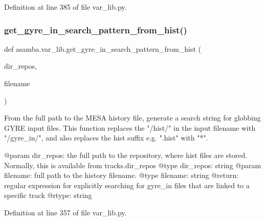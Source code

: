 Definition at line 385 of file var\+\_\+lib.\+py.

\mbox{\label{namespaceasamba_1_1var__lib_a6872a059696addcf6898489c86fb9458}} 
\subsubsection{\texorpdfstring{get\+\_\+gyre\+\_\+in\+\_\+search\+\_\+pattern\+\_\+from\+\_\+hist()}{get\_gyre\_in\_search\_pattern\_from\_hist()}}
{\footnotesize\ttfamily def asamba.\+var\+\_\+lib.\+get\+\_\+gyre\+\_\+in\+\_\+search\+\_\+pattern\+\_\+from\+\_\+hist (\begin{DoxyParamCaption}\item[{}]{dir\+\_\+repos,  }\item[{}]{filename }\end{DoxyParamCaption})}

\begin{DoxyVerb}From the full path to the MESA history file, generate a search string for globbing GYRE input files.
This function replaces the "/hist/" in the input filename with "/gyre_in/", and also replaces the 
hist suffix e.g. ".hist" with "*".

@param dir_repos: the full path to the repository, where hist files are stored. Normally, this is 
       available from tracks.dir_repos
@type dir_repos: string
@param filename: full path to the history filename. 
@type filename: string
@return: regular expression for explicitly searching for gyre_in files that are linked to a specific
      track
@rtype: string
\end{DoxyVerb}
 

Definition at line 357 of file var\+\_\+lib.\+py.

\mbox{\label{namespaceasamba_1_1var__lib_a31c9bde7f3cc889b6f3bd873d002dbf1}} 
